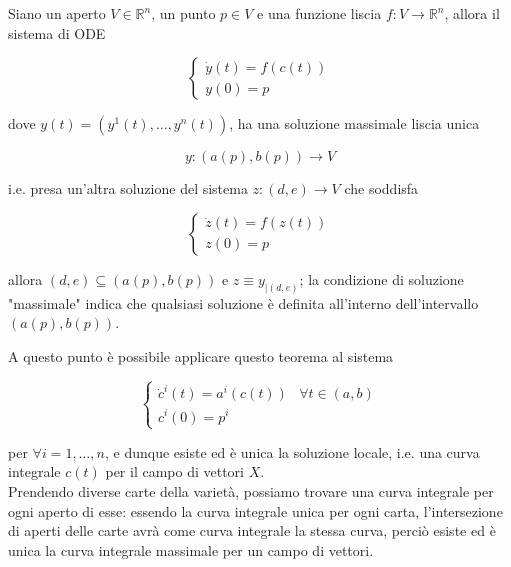 \begin{theorem}
	Siano un aperto $ V \in \mathbb{R}^{n} $, un punto $ p \in V $ e una funzione liscia $ f : V \to \mathbb{R}^{n} $, allora il sistema di ODE
	
	\begin{equation}
		\begin{cases}
			\dot{y}(t) = f(c(t))\\
			y(0) = p
		\end{cases}
	\end{equation}
	
	dove $ y(t) = (y^{1}(t),\dots,y^{n}(t)) $, ha una soluzione massimale liscia unica
	
	\begin{equation}
		y : (a(p),b(p)) \to V
	\end{equation}

	i.e. presa un'altra soluzione del sistema $ z : (d,e) \to V $ che soddisfa
	
	\begin{equation}
		\begin{cases}
			\dot{z}(t) = f(z(t))\\
			z(0) = p
		\end{cases}
	\end{equation}

	allora $ (d,e) \subseteq (a(p),b(p)) $ e $ z \equiv y_{|(d,e)} $; la condizione di soluzione "massimale" indica che qualsiasi soluzione è definita all'interno dell'intervallo $ (a(p),b(p)) $.
\end{theorem}

A questo punto è possibile applicare questo teorema al sistema

\begin{equation}
	\begin{cases}
		\dot{c}^{i}(t) = a^{i}(c(t)) & \forall t \in (a,b)\\
		c^{i}(0) = p^{i}
	\end{cases}
\end{equation}

per $ \forall i=1,\dots,n $, e dunque esiste ed è unica la soluzione locale, i.e. una curva integrale $ c(t) $ per il campo di vettori $ X $.\\
Prendendo diverse carte della varietà, possiamo trovare una curva integrale per ogni aperto di esse: essendo la curva integrale unica per ogni carta, l'intersezione di aperti delle carte avrà come curva integrale la stessa curva, perciò esiste ed è unica la curva integrale massimale per un campo di vettori.

